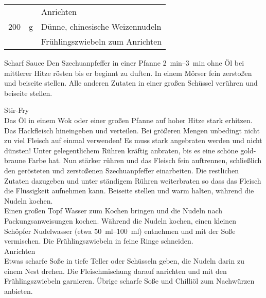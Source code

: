 \vspace{0.3cm}

\begin{tabular}{ R{1cm}@{\,}L{1cm} L{10cm}}
& & {\large Anrichten}\vspace{0.1cm} \\
200    &  \si{\gram}         &  Dünne, chinesische Weizennudeln  \\
       &                 &  Frühlingszwiebeln zum Anrichten  \\
\end{tabular}
\vspace{1cm}

\begin{recipestep}{Scharf Sauce}
Den Szechuanpfeffer in einer Pfanne \SIrange{2}{3}{\minute} ohne Öl bei mittlerer Hitze rösten bis er beginnt zu duften.
In einem Mörser fein zerstoßen und beiseite stellen. Alle anderen Zutaten in einer großen Schüssel verühren und beiseite stellen.
\end{recipestep}

{\large Stir-Fry}\vspace{0.1cm}\\
Das Öl in einem Wok oder einer großen Pfanne auf hoher Hitze stark erhitzen. Das Hackfleisch hineingeben und verteilen.
Bei größeren Mengen unbedingt nicht zu viel Fleisch auf einmal verwenden! Es muss stark angebraten werden und nicht dünsten!
Unter gelegentlichem Rühren kräftig anbraten, bis es eine schöne gold-braune Farbe hat. Nun stärker rühren und das Fleisch fein
auftrennen, schließlich den gerösteten und zerstoßenen Szechuanpfeffer einarbeiten. Die restlichen Zutaten dazugeben und unter
ständigem Rühren weiterbraten so dass das Fleisch die Flüssigkeit aufnehmen kann. Beiseite stellen und warm halten, während die Nudeln kochen.  \\

Einen großen Topf Wasser zum Kochen bringen und die Nudeln nach Packungsanweisungen kochen. Während die Nudeln kochen, einen kleinen Schöpfer
Nudelwasser (etwa \SIrange{50}{100}{\milli\litre}) entnehmen und mit der Soße vermischen. Die Frühlingszwiebeln in feine Ringe schneiden.  \\

{\large Anrichten}\vspace{0.1cm}\\
Etwas scharfe Soße in tiefe Teller oder Schüsseln geben, die Nudeln darin zu einem Nest drehen.
Die Fleischmischung darauf anrichten und mit den Frühlingszwiebeln garnieren. Übrige scharfe Soße und Chilliöl
zum Nachwürzen anbieten.


